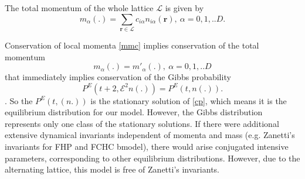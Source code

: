The total momentum of the whole lattice $\mathcal{L}$ is given by
\begin{equation} \label{momentum}
m_{\alpha}(.) = \sum_{\bm{r} \in \mathcal{L}} c_{i\alpha} n_{i\alpha}(\bm{r}),~\alpha=0,1,..D.
\end{equation}

Conservation of local momenta \ref{mmc} implies conservation of the total momentum
\begin{equation}
m_{\alpha}(.) = m'_{\alpha}(.),~\alpha=0,1,..D
\end{equation}
that immediately implies conservation of the Gibbs probability
\begin{equation}
P^E(t+2,\mathcal{E}^2n(.)) = P^E(t,n(.)).
\end{equation}.
So the $P^E(t,(n.))$ is the stationary solution of \ref{cp}, which means it is the equilibrium distribution for our model. However, the Gibbs distribution represents only one class of the stationary solutions. If there were additional extensive dynamical invariants independent of momenta and mass (e.g. Zanetti's invariants for FHP and FCHC bmodel), there would arise conjugated intensive parameters, corresponding to other equilibrium distributions. However, due to the alternating lattice, this model is free of Zanetti's invariants.

\bigskip

